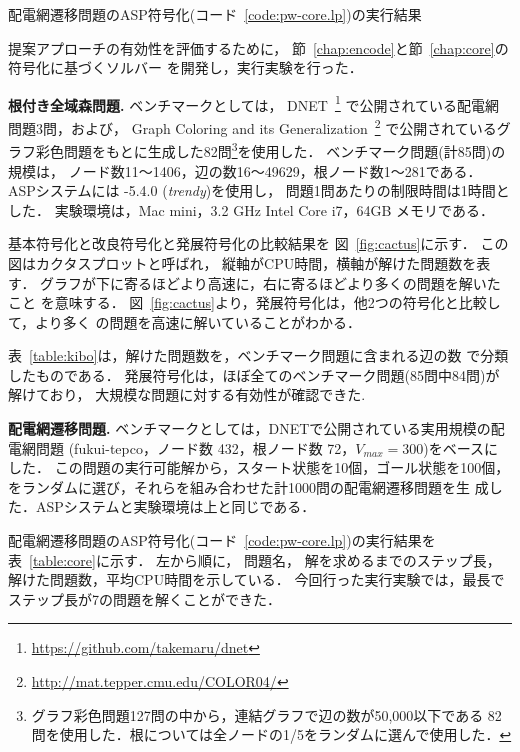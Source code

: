 \begin{table}[t]
  \centering
  \caption{配電網遷移問題のASP符号化(コード~\ref{code:pw-core.lp})の実行結果}
  \label{table:core}
  
\end{table}

提案アプローチの有効性を評価するために，
節~\ref{chap:encode}と節~\ref{chap:core}の符号化に基づくソルバー
を開発し，実行実験を行った．

\textbf{根付き全域森問題.}
ベンチマークとしては，
DNET~\footnote{\url{https://github.com/takemaru/dnet}}
で公開されている配電網問題3問，および，
Graph Coloring and its Generalization~\footnote{\url{http://mat.tepper.cmu.edu/COLOR04/}}
で公開されているグラフ彩色問題をもとに生成した82問\footnote{%
グラフ彩色問題127問の中から，連結グラフで辺の数が50,000以下である
82問を使用した．根については全ノードの1/5をランダムに選んで使用した．
}を使用した．
ベンチマーク問題(計85問)の規模は，
ノード数11〜1406，辺の数16〜49629，根ノード数1〜281である．
%
ASPシステムには {\clingo}-5.4.0 (\textit{trendy})を使用し，
問題1問あたりの制限時間は1時間とした．
実験環境は，Mac mini，3.2 GHz Intel Core i7，64GB メモリである．

基本符号化と改良符号化と発展符号化の比較結果を
図~\ref{fig:cactus}に示す．
この図はカクタスプロットと呼ばれ，
縦軸がCPU時間，横軸が解けた問題数を表す．
グラフが下に寄るほどより高速に，右に寄るほどより多くの問題を解いたこと
を意味する．
図~\ref{fig:cactus}より，発展符号化は，他2つの符号化と比較して，より多く
の問題を高速に解いていることがわかる．

表~\ref{table:kibo}は，解けた問題数を，ベンチマーク問題に含まれる辺の数
で分類したものである．
発展符号化は，ほぼ全てのベンチマーク問題(85問中84問)が解けており，
大規模な問題に対する有効性が確認できた. 

\textbf{配電網遷移問題.}
ベンチマークとしては，DNETで公開されている実用規模の配電網問題
({\sf fukui-tepco}，ノード数 432，根ノード数 72，$V_{max}=300$)をベースにした．
この問題の実行可能解から，スタート状態を10個，ゴール状態を100個，
をランダムに選び，それらを組み合わせた計1000問の配電網遷移問題を生
成した．ASPシステムと実験環境は上と同じである．

配電網遷移問題のASP符号化(コード~\ref{code:pw-core.lp})の実行結果を
表~\ref{table:core}に示す．
左から順に，
問題名，
解を求めるまでのステップ長，解けた問題数，平均CPU時間を示している．
今回行った実行実験では，最長でステップ長が7の問題を解くことができた．


